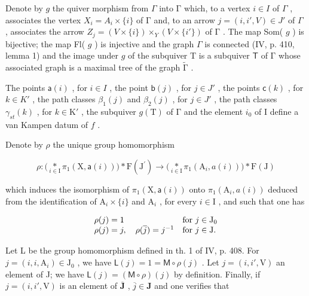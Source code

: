 Denote by \(g\) the quiver morphism from \(\Gamma\) into \(\textsf{Γ}\) which, to a vertex \(i \in I\) of \(\Gamma\) , associates the vertex \(X_i = A_i \times \{i\}\) of \(\textsf{Γ}\) and, to an arrow \(j = (i, i', V) \in J'\) of \(\Gamma\) , associates the arrow \(Z_j = (V \times \{i\}) \times_Y(V \times \{i'\})\) of \(\textsf{Γ}\) . The map Som( \(g\) ) is bijective; the map Fl( \(g\) ) is injective and the graph \(\Gamma\) is connected (IV, p. 410, lemma 1) and the image under \(g\) of the subquiver T is a subquiver \(\mathsf{T}\) of \(\textsf{Γ}\) whose associated graph is a maximal tree of the graph \(\widetilde{\textsf{Γ}}\) .

The points \(\mathsf{a}(i)\) , for \(i \in I\) , the point \(\mathsf{b}(j)\) , for \(j \in J'\) , the points \(\mathsf{c}(k)\) , for \(k \in K'\) , the path classes \(\beta_{1}(j)\) and \(\beta_{2}(j)\) , for \(j \in J'\) , the path classes \(\gamma_{st}(k)\) , for \(k \in \mathrm{K}'\) , the subquiver \(g(\mathrm{T})\) of \(\textsf{Γ}\) and the element \(i_0\) of I define a van Kampen datum of \(f\) .

Denote by \(\rho\) the unique group homomorphism

\[
\rho \colon \big (\underset {i \in \mathrm{I}} {*} \pi_ {1} (\mathrm{X}, \mathsf {a} (i)) \big) * \mathrm{F} (\mathrm{J} ^ {\prime}) \to \big (\underset {i \in \mathrm{I}} {*} \pi_ {1} (\mathrm{A} _ {i}, a (i)) \big) * \mathrm{F} (\mathrm{J})
\]

which induces the isomorphism of \(\pi_1(\mathrm{X},\mathsf{a}(i))\) onto \(\pi_1(\mathrm{A}_i,a(i))\) deduced from the identification of \(\mathrm{A}_i\times \{i\}\) and \(\mathrm{A}_i\) , for every \(i\in \mathrm{I}\) , and such that one has

\[
\begin{array}{l l} \rho (j) = 1 & \text {for } j \in \mathrm{J} _ {0} \\ \rho (j) = j, \quad \rho (\overline {{j}}) = j ^ {- 1} & \text {for } j \in \mathrm{J}. \end{array}
\]

Let L be the group homomorphism defined in th. 1 of IV, p. 408. For \(j = (i, i, \mathrm{A}_i) \in \mathrm{J}_0\) , we have \(\mathsf{L}(j) = 1 = \mathsf{M} \circ \rho(j)\) . Let \(j = (i, i', \mathrm{V})\) an element of J; we have \(\mathsf{L}(j) = (\mathsf{M} \circ \rho)(j)\) by definition. Finally, if \(j = (i, i', \mathrm{V})\) is an element of \(\overline{\mathbf{J}}\) , \(\overline{j} \in \mathbf{J}\) and one verifies that

